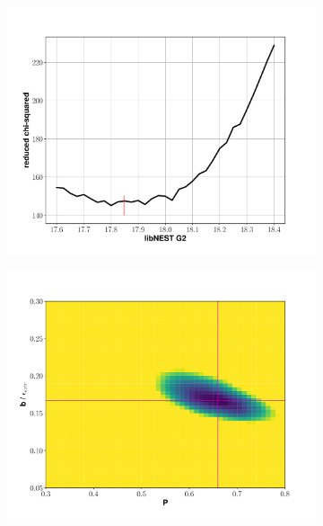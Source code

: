 \begin{figure}[h!]
\centering
\begin{subfigure}{0.5\textwidth}
  \centering
  \includegraphics[width=\textwidth]{Figures/S2tail_g2fit_z.pdf}
\end{subfigure}%
\begin{subfigure}{0.5\textwidth}
  \centering
  \includegraphics[width=\textwidth]{Figures/S2tail_heatmap_z.pdf}
\end{subfigure}
\begin{subfigure}{0.5\textwidth}
  \centering

\end{subfigure}
\end{figure}
